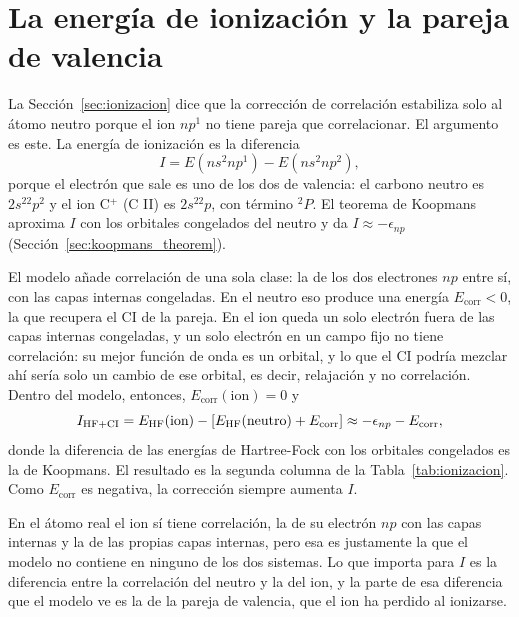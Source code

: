 \documentclass[11pt,a4paper]{article}
\begin{document}
\begin{table}[htbp]
  \centering\small
  
  \caption{Las tres versiones de $\zeta_{\text{NIST}}$ frente al valor calculado y a la cota de
  núcleo desnudo (cm$^{-1}$). $D$ es el coeficiente del término tensorial.}
  \label{tab:det_zeta_cotas}
\end{table}

\section{La energía de ionización y la pareja de valencia}
\label{det:ionizacion}

La Sección~\ref{sec:ionizacion} dice que la corrección de correlación estabiliza solo al átomo
neutro porque el ion $np^1$ no tiene pareja que correlacionar. El argumento es este. La energía de
ionización es la diferencia
\begin{equation}
  I = E(ns^2np^1) - E(ns^2np^2),
\end{equation}
porque el electrón que sale es uno de los dos de valencia: el carbono neutro es $2s^22p^2$ y el
ion C$^+$ (C II) es $2s^22p$, con término $^2P$. El teorema de Koopmans aproxima $I$ con los
orbitales congelados del neutro y da $I \approx -\epsilon_{np}$
(Sección~\ref{sec:koopmans_theorem}).

El modelo añade correlación de una sola clase: la de los dos electrones $np$ entre sí, con las capas
internas congeladas. En el neutro eso produce una energía $E_{\text{corr}} < 0$, la que recupera el
CI de la pareja. En el ion queda un solo electrón fuera de las capas internas congeladas, y un solo
electrón en un campo fijo no tiene correlación: su mejor función de onda es un orbital, y lo que el
CI podría mezclar ahí sería solo un cambio de ese orbital, es decir, relajación y no correlación.
Dentro del modelo, entonces, $E_{\text{corr}}(\text{ion}) = 0$ y
\begin{equation}
  I_{\text{HF+CI}} = E_{\text{HF}}(\text{ion}) - \qty[E_{\text{HF}}(\text{neutro}) + E_{\text{corr}}]
  \approx -\epsilon_{np} - E_{\text{corr}},
\end{equation}
donde la diferencia de las energías de Hartree-Fock con los orbitales congelados es la de
Koopmans. El resultado es la segunda columna de la Tabla~\ref{tab:ionizacion}. Como $E_{\text{corr}}$ es negativa, la
corrección siempre aumenta $I$.

En el átomo real el ion sí tiene correlación, la de su electrón $np$ con las capas internas y la de
las propias capas internas, pero esa es justamente la que el modelo no contiene en ninguno de los
dos sistemas. Lo que importa para $I$ es la diferencia entre la correlación del neutro y la del
ion, y la parte de esa diferencia que el modelo ve es la de la pareja de valencia, que el ion ha
perdido al ionizarse.
\end{document}
